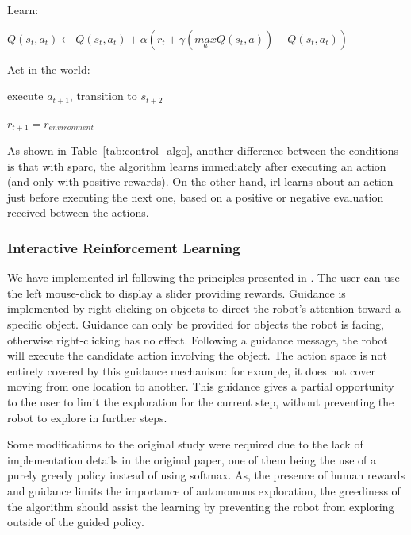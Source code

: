 \begin{table}
\begin{minipage}[t]{0.5\textwidth}
\begin{algorithm}[H]
\begin{minipage}{0.9\linewidth}
{		\nosemic Learn:
		 
		\pushline\dosemic$Q(s_{t},a_{t}) \leftarrow Q(s_{t},a_{t}) + \alpha (r_{t}+\gamma (\underset{a}{max} Q(s_{t},a))-Q(s_{t},a_{t}))$
		
		\popline \nosemic Act in the world:
		
		\pushline\dosemic execute $a_{t+1}$, transition to $s_{t+2}$
		
		\popline$r_{t+1} = r_{environment}$
	}
	\end{minipage}
	\end{algorithm}
\end{minipage}
\label{tab:control_algo}
\end{table}

As shown in Table~\ref{tab:control_algo}, another difference between the conditions is that with \gls{sparc}, the algorithm learns immediately after executing an action (and only with positive rewards). On the other hand, \gls{irl} learns about an action just before executing the next one, based on a positive or negative evaluation received between the actions.

\subsubsection{Interactive Reinforcement Learning}

We have implemented \gls{irl} following the principles presented in \cite{thomaz2008teachable}. The user can use the left mouse-click to display a slider providing rewards. Guidance is implemented by right-clicking on objects to direct the robot's attention toward a specific object. Guidance can only be provided for objects the robot is facing, otherwise right-clicking has no effect. Following a guidance message, the robot will execute the candidate action involving the object. The action space is not entirely covered by this guidance mechanism: for example, it does not cover moving from one location to another. This guidance gives a partial opportunity to the user to limit the exploration for the current step, without preventing the robot to explore in further steps.

Some modifications to the original study were required due to the lack of implementation details in the original paper, one of them being the use of a purely greedy policy instead of using softmax. As, the presence of human rewards and guidance limits the importance of autonomous exploration, the greediness of the algorithm should assist the learning by preventing the robot from exploring outside of the guided policy. 

